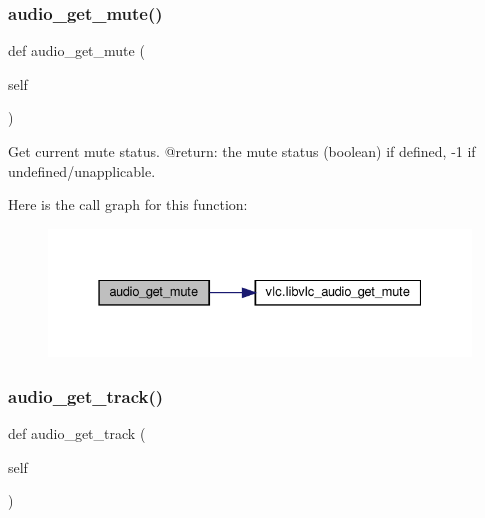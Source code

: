 \subsubsection{\texorpdfstring{audio\+\_\+get\+\_\+mute()}{audio\_get\_mute()}}
{\footnotesize\ttfamily def audio\+\_\+get\+\_\+mute (\begin{DoxyParamCaption}\item[{}]{self }\end{DoxyParamCaption})}

\begin{DoxyVerb}Get current mute status.
@return: the mute status (boolean) if defined, -1 if undefined/unapplicable.
\end{DoxyVerb}
 Here is the call graph for this function\+:
\nopagebreak
\begin{figure}[H]
\begin{center}
\leavevmode
\includegraphics[width=331pt]{classvlc_1_1_media_player_a9baa0970647aed79716319f4f956013d_cgraph}
\end{center}
\end{figure}
\mbox{\label{classvlc_1_1_media_player_a7b62c60ce56f76126fc65bf2c573c264}} 
\subsubsection{\texorpdfstring{audio\+\_\+get\+\_\+track()}{audio\_get\_track()}}
{\footnotesize\ttfamily def audio\+\_\+get\+\_\+track (\begin{DoxyParamCaption}\item[{}]{self }\end{DoxyParamCaption})}

